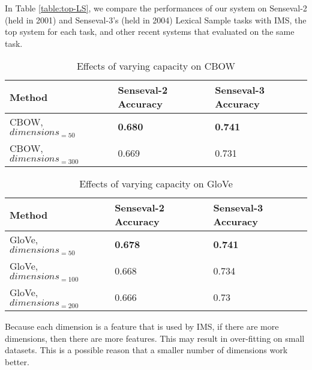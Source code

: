 \documentclass[11pt]{article}
\begin{document}
In Table \ref{table:top-LS}, we compare the performances of our system on Senseval-2 (held in 2001) and Senseval-3's (held in 2004) Lexical Sample tasks with IMS, the top system for each task, and other recent systems that evaluated on the same task.


\begin{table}[ht]
	\caption{Effects of varying capacity on CBOW}
	\label{table:wordembeddings-word2vec-accuracy}
	\begin{center}
		\begin{tabular}{| p{7cm} | p{4cm} | p{4cm} |}
			\hline
			Method & Senseval-2 Accuracy & Senseval-3 Accuracy \\
			\hline
			CBOW, $dimensions_{=50}$ & {\bf0.680} & {\bf0.741} \\
			\hline
			CBOW, $dimensions_{=300}$ & 0.669 & 0.731 \\
			\hline
			
		\end{tabular}
	\end{center}
\end{table}

\begin{table}[ht]
	\caption{Effects of varying capacity on GloVe}
	\label{table:wordembeddings-glove-accuracy}
	\begin{center}
		\begin{tabular}{| p{7cm} | p{4cm} | p{4cm} |}
			\hline
			Method & Senseval-2 Accuracy & Senseval-3 Accuracy \\
			\hline
			GloVe, $dimensions_{=50}$ & {\bf0.678} & {\bf0.741} \\
			\hline
			GloVe, $dimensions_{=100}$ & 0.668 & 0.734 \\
			\hline
			GloVe, $dimensions_{=200}$ & 0.666 & 0.73 \\
			\hline
			
		\end{tabular}
	\end{center}
\end{table}



Because each dimension is a feature that is used by IMS, if there are more dimensions, then there are more features. This may result in over-fitting on small datasets. This is a possible reason that a smaller number of dimensions work better. 
\end{document}
